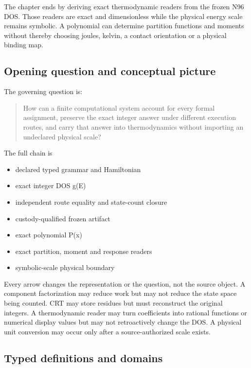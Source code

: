 The chapter ends by deriving exact thermodynamic readers from the frozen
N96 DOS. Those readers are exact and dimensionless while the physical
energy scale remains symbolic. A polynomial can determine partition
functions and moments without thereby choosing joules, kelvin, a contact
orientation or a physical binding map.

\subsection{Opening question and conceptual
picture}\label{viii-ch03-opening-question-and-conceptual-picture}

The governing question is:

\begin{quote}
How can a finite computational system account for every formal
assignment, preserve the exact integer answer under different execution
routes, and carry that answer into thermodynamics without importing an
undeclared physical scale?
\end{quote}

The full chain is

\begin{itemize}
\tightlist
\item
  declared typed grammar and Hamiltonian
\item
  exact integer DOS g(E)
\item
  independent route equality and state-count closure
\item
  custody-qualified frozen artifact
\item
  exact polynomial P(x)
\item
  exact partition, moment and response readers
\item
  symbolic-scale physical boundary
\end{itemize}

Every arrow changes the representation or the question, not the source
object. A component factorization may reduce work but may not reduce the
state space being counted. CRT may store residues but must reconstruct
the original integers. A thermodynamic reader may turn coefficients into
rational functions or numerical display values but may not retroactively
change the DOS. A physical unit conversion may occur only after a
source-authorized scale exists.

\subsection{Typed definitions and
domains}\label{viii-ch03-typed-definitions-and-domains}

